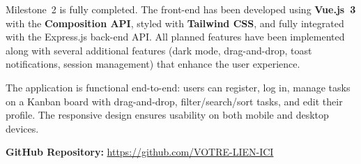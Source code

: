 \documentclass[12pt, a4paper]{article}
\begin{document}
Milestone~2 is fully completed. The front-end has been developed using \textbf{Vue.js~3} with the \textbf{Composition API}, styled with \textbf{Tailwind CSS}, and fully integrated with the Express.js back-end API. All planned features have been implemented along with several additional features (dark mode, drag-and-drop, toast notifications, session management) that enhance the user experience.

The application is functional end-to-end: users can register, log in, manage tasks on a Kanban board with drag-and-drop, filter/search/sort tasks, and edit their profile. The responsive design ensures usability on both mobile and desktop devices.

\vspace{1em}
\textbf{GitHub Repository:} \url{https://github.com/VOTRE-LIEN-ICI}
\end{document}
